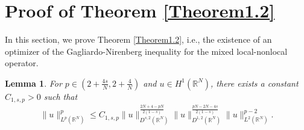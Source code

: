 \documentclass[12pt,a4paper,reqno]{amsart}
\numberwithin{equation}{section}
\newtheorem{lemma}{Lemma}[section]
\begin{document}
\section{Proof of Theorem \ref{Theorem1.2}}
In this section,
we prove Theorem \ref{Theorem1.2},
i.e.,
the existence of an optimizer of the Gagliardo-Nirenberg inequality for the mixed local-nonlocal operator.

\begin{lemma}\label{Lemma4.1}
For $p\in(2+\frac{4s}{N},2+\frac{4}{N})$ and $u\in H^{1}(\mathbb{R}^{N})$,
there exists a constant $C_{1,s,p}>0$ such that
\begin{equation}\label{4.1}
\begin{aligned}
\|u\|_{L^{p}(\mathbb{R}^{N})}^{p}
\leqslant C_{1,s,p}
\|u\|_{D^{s,2}(\mathbb{R}^{N})}^{\frac{2N+4-pN}{2(1-s)}}
\|u\|_{D^{1,2}(\mathbb{R}^{N})}^{\frac{pN-2N-4s}{2(1-s)}}
\|u\|_{L^{2}(\mathbb{R}^{N})}^{p-2}.
\end{aligned}
\end{equation}
\end{lemma}
\end{document}
